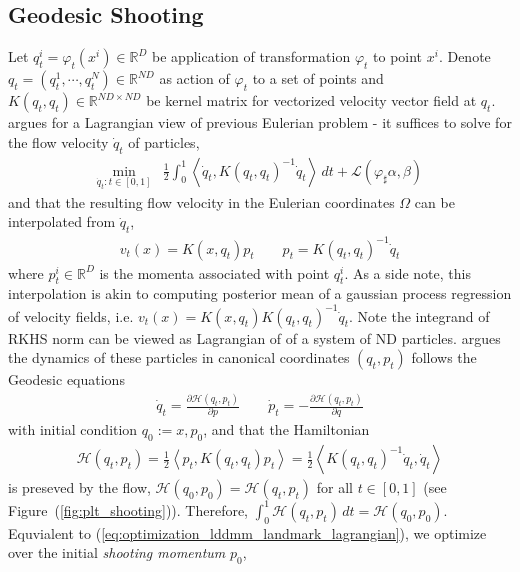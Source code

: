 \documentclass{6838publ}
\newcommand\sH{\ensuremath{\mathcal{H}}}
\newcommand\sL{\ensuremath{\mathcal{L}}}
\newcommand\R{\ensuremath{\mathbb{R}}} %
\newcommand\inner[2]{\ensuremath{\left< #1, #2 \right>}} %
\begin{document}
\subsection{Geodesic Shooting}

Let $q_t^i = \varphi_t(x^i) \in \R^D$ be application of transformation $\varphi_t$ to point $x^i$. Denote $q_t = (q_t^1, \cdots, q_t^N) \in \R^{ND}$ as action of $\varphi_t$ to a set of points and $K(q_t,q_t) \in \R^{ND\times ND}$ be kernel matrix for vectorized velocity vector field at $q_t$. \cite{joshiLandmarkMatchingLarge2000} argues for a Lagrangian view of previous Eulerian problem - it suffices to solve for the flow velocity $\dot{q}_t$ of particles,
\begin{align}
    \min_{\dot{q}_t:t\in [0,1]}
        &\frac{1}{2} \int_0^1 \inner{\dot{q}_t}{K(q_t,q_t)^{-1}\dot{q}_t} \, dt + \sL(\varphi_\sharp \alpha, \beta)
    \label{eq:optimization_lddmm_landmark_lagrangian}
\end{align}
and that the resulting flow velocity in the Eulerian coordinates $\Omega$ can be interpolated from $\dot{q}_t$,
\begin{align}
    v_t(x)
        = K(x, q_t) p_t
    \quad\quad
    p_t
        = K(q_t, q_t)^{-1} \dot{q}_t
\end{align}
where $p_t^i \in \R^{D}$ is the momenta associated with point $q_t^i$. As a side note, this interpolation is akin to computing posterior mean of a gaussian process regression of velocity fields, i.e. $v_t(x) = K(x,q_t) K(q_t,q_t)^{-1} \dot{q}_t$. Note the integrand of RKHS norm can be viewed as Lagrangian of of a system of ND particles. \cite{millerGeodesicShootingComputational2006} argues the dynamics of these particles in canonical coordinates $(q_t,p_t)$ follows the Geodesic equations
\begin{align}
    \dot{q}_t
        = \frac{\partial \sH(q_t,p_t)}{\partial p}
    \quad\quad
    \dot{p}_t
        = - \frac{\partial \sH(q_t,p_t)}{\partial q}
    \label{eq:geodesic_equations}
\end{align}
with initial condition $q_0 := x, p_0$, and that the Hamiltonian 
\begin{align}
    \sH(q_t,p_t) = \frac{1}{2}\inner{p_t}{K(q_t,q_t)p_t} = \frac{1}{2}\inner{K(q_t,q_t)^{-1}\dot{q}_t}{\dot{q}_t}  
\end{align}
is preseved by the flow, $\sH(q_0,p_0)  = \sH(q_t,p_t)$ for all $t\in [0,1]$ (see Figure~(\ref{fig:plt_shooting})). Therefore, $\int_0^1 \sH(q_t,p_t) \, dt = \sH(q_0, p_0)$. Equvialent to (\ref{eq:optimization_lddmm_landmark_lagrangian}), we optimize over the initial \textit{shooting momentum} $p_0$,
\end{document}
